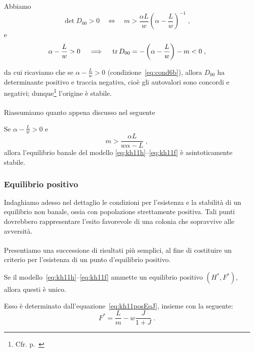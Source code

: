 Abbiamo
$$\det  D_{00} > 0 \quad \iff \quad
m > \frac{\alpha L}{w} {\left( \alpha - \frac{L}{w} \right)}^{-1} \; ,$$
e
$$ \alpha - \frac{L}{w} > 0  \quad \implies \quad
\operatorname{tr} D_{00} = - \left( \alpha - \frac{L}{w} \right) - m < 0 \; ,$$

da cui ricaviamo che se $\alpha -\frac{L}{w}>0$ (condizione~\eqref{eq:cond6b}), allora $D_{00}$ ha
determinante positivo e traccia negativa, cioè gli autovalori sono concordi e negativi;
dunque\footnote{Cfr. p.~\pageref{teo:pozzoNonLineare}} l'origine è stabile.

\paragraph{}
Riassumiamo quanto appena discusso nel seguente
\begin{lemma}
    Se $\alpha - \frac{L}{w} > 0$ e
    $$m > \frac{\alpha L}{w \alpha -L} \; ,$$
    allora l'equilibrio banale del modello \eqref{eq:kh11h}--\eqref{eq:kh11f} è asintoticamente stabile.
    \label{lem:eqBanKh}
\end{lemma}


\subsubsection{Equilibrio positivo}
Indaghiamo adesso nel dettaglio le condizioni per l'esistenza e la stabilità di un equilibrio non banale, ossia
con popolazione strettamente positiva. Tali punti dovrebbero rappresentare l'esito favorevole di una colonia che
sopravvive alle avversità.

\paragraph{}
Presentiamo una successione di risultati più semplici, al fine di costituire un criterio per l'esistenza di
un punto d'equilibrio positivo.

\begin{proposizione}
    Se il modello~\eqref{eq:kh11h}--\eqref{eq:kh11f} ammette un equilibrio positivo $(H^*, F^*)$, allora
    questi è unico.

    Esso è determinato dall'equazione~\eqref{eq:kh11posEqJ}, insieme con la seguente:
    \begin{equation}
        F^* = \frac{L}{m} - w \frac{J}{1+J} \; .
        \label{eq:kh11posEqF}
    \end{equation}

    \label{teo:exUniqFstarPos} %
\end{proposizione}

